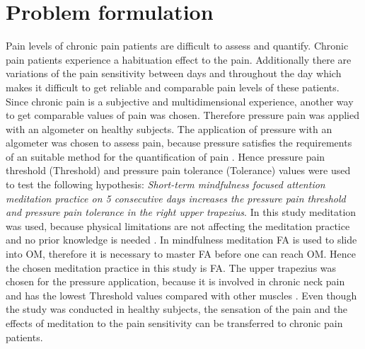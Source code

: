 \chapter{Problem formulation}

Pain levels of chronic pain patients are difficult to assess and quantify. Chronic pain patients experience a habituation effect to the pain. Additionally there are variations of the pain sensitivity between days and throughout the day which makes it difficult to get reliable and comparable pain levels of these patients. Since chronic pain is a subjective and multidimensional experience, another way to get comparable values of pain was chosen. Therefore pressure pain was applied with an algometer on healthy subjects. The application of pressure with an algometer was chosen to assess pain, because pressure satisfies the requirements of an suitable method for the quantification of pain \cite{Keele1954}. Hence pressure pain threshold (Threshold) and pressure pain tolerance (Tolerance) values were used to test the following hypothesis:
\textit{Short-term mindfulness focused attention meditation practice on 5 consecutive days increases the pressure pain threshold and pressure pain tolerance in the right upper trapezius}. In this study meditation was used, because physical limitations are not affecting the meditation practice and no prior knowledge is needed \cite{Tang2017}. In mindfulness meditation FA is used to slide into OM, therefore it is necessary to master FA before one can reach OM. \cite{Perlman2016, Zeidan2016,Kabat1982} Hence the chosen meditation practice in this study is FA. The upper trapezius was chosen for the pressure application, because it is involved in chronic neck pain and has the lowest Threshold values compared with other muscles \cite{Falla2004,Fischer1987}. Even though the study was conducted in healthy subjects, the sensation of the pain and the effects of meditation to the pain sensitivity can be transferred to chronic pain patients.


